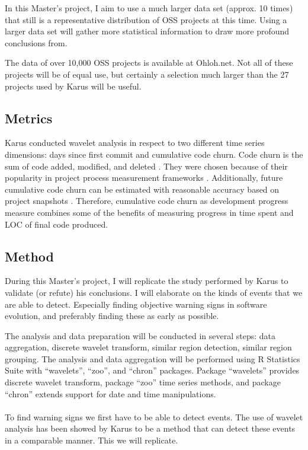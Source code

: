 In this Master's project, I aim to use a much larger data set (approx. 10 times)
that still is a representative distribution of OSS projects at this time. Using
a larger data set will gather more statistical information to draw more
profound conclusions from.

The data of over 10,000 OSS projects is available at Ohloh.net. Not all of these
projects will be of equal use, but certainly a selection much larger than the 27
projects used by Karus will be useful.

\subsection{Metrics}
Karus conducted wavelet analysis in respect to two different time series
dimensions: days since first commit and cumulative code churn. Code churn is the
sum of code added, modified, and deleted \cite{elbaum}. They were chosen because
of their popularity in project process measurement frameworks \cite{karus2013}.
Additionally, future cumulative code churn can be estimated with reasonable
accuracy based on project snapshots \cite{dumas}. Therefore, cumulative code
churn as development progress measure combines some of the benefits of measuring
progress in time spent and LOC of final code produced.

\subsection{Method}
During this Master's project, I will replicate the study performed by Karus to
validate (or refute) his conclusions. I will elaborate on the kinds of events
that we are able to detect. Especially finding objective warning signs in
software evolution, and preferably finding these as early as possible.

The analysis and data preparation will be conducted in several steps: data
aggregation, discrete wavelet transform, similar region detection, similar
region grouping. The analysis and data aggregation will be performed using R
Statistics Suite with ``wavelets'', ``zoo'', and ``chron'' packages. Package
``wavelets'' provides discrete wavelet transform, package ``zoo'' time series
methods, and package ``chron'' extends support for date and time manipulations.

\paragraph{}
To find warning signs we first have to be able to detect events. The use
of wavelet analysis has been showed by Karus \cite{karus2013} to be a method
that can detect these events in a comparable manner. This we will replicate.

